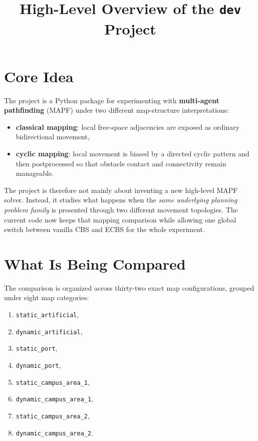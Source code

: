\documentclass[11pt]{article}
\title{High-Level Overview of the \texttt{dev} Project}
\author{}
\date{}
\begin{document}
\maketitle

\section{Core Idea}

The project is a Python package for experimenting with \textbf{multi-agent pathfinding} (MAPF) under two different map-structure interpretations:
\begin{itemize}[leftmargin=2em]
    \item \textbf{classical mapping}: local free-space adjacencies are exposed as ordinary bidirectional movement,
    \item \textbf{cyclic mapping}: local movement is biased by a directed cyclic pattern and then postprocessed so that obstacle contact and connectivity remain manageable.
\end{itemize}

The project is therefore not mainly about inventing a new high-level MAPF solver. Instead, it studies what happens when the \emph{same underlying planning problem family} is presented through two different movement topologies. The current code now keeps that mapping comparison while allowing one global switch between vanilla CBS and ECBS for the whole experiment.

\section{What Is Being Compared}

The comparison is organized across thirty-two exact map configurations, grouped under eight map categories:
\begin{enumerate}[leftmargin=2em]
    \item \texttt{static\_artificial},
    \item \texttt{dynamic\_artificial},
    \item \texttt{static\_port},
    \item \texttt{dynamic\_port},
    \item \texttt{static\_campus\_area\_1},
    \item \texttt{dynamic\_campus\_area\_1},
    \item \texttt{static\_campus\_area\_2},
    \item \texttt{dynamic\_campus\_area\_2}.
\end{enumerate}
\end{document}
